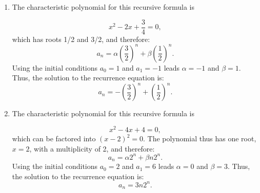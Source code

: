 \begin{problem}{1} $ $

	\begin{enumerate}
		\item The characteristic polynomial for this recursive formula is
		
		\begin{equation*}
		x^2-2x+\frac{3}{4}=0,
		\end{equation*}
		which has roots 1/2 and 3/2, and therefore:		
		\begin{equation*}
		a_n=\alpha \left(\frac{3}{2} \right)^n+\beta \left(\frac{1}{2} \right)^n.
		\end{equation*}
		Using the initial conditions $a_0=1$ and $a_1=-1$ leads $\alpha=-1$ and $\beta=1$.  Thus, the solution to the recurrence equation is:
		\begin{equation*}
		a_n=-\left(\frac{3}{2} \right)^n+ \left(\frac{1}{2} \right)^n.
		\end{equation*}
		
		\item  The characteristic polynomial for this recursive formula is
		
		\begin{equation*}
		x^2-4x+4=0,
		\end{equation*}
		which can be factored into $(x-2)^2=0$.  The polynomial thus has one root, $x=2$, with a multiplicity of 2, and therefore:
		\begin{equation*}
		a_n=\alpha 2^n+\beta n 2^n.
		\end{equation*}
		Using the initial conditions $a_0=2$ and $a_1=6$ leads $\alpha=0$ and $\beta=3$.  Thus, the solution to the recurrence equation is:
		\begin{equation*}
		a_n=3n2^n.
		\end{equation*}

	\end{enumerate}

\end{problem}


